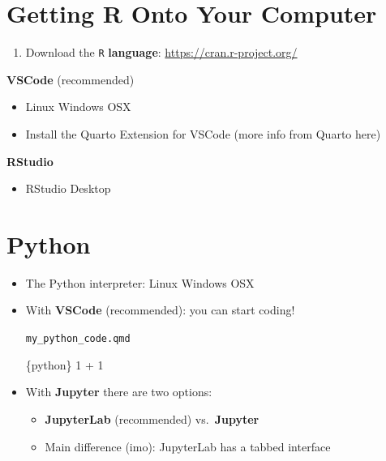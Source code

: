 \documentclass[
  letterpaper,
  DIV=11,
  numbers=noendperiod,
  oneside]{scrreprt}
\newenvironment{Shaded}{\begin{snugshade}}{\end{snugshade}}
\newcommand{\DecValTok}[1]{\textcolor[rgb]{0.68,0.00,0.00}{#1}}
\newcommand{\InformationTok}[1]{\textcolor[rgb]{0.37,0.37,0.37}{#1}}
\newcommand{\OperatorTok}[1]{\textcolor[rgb]{0.37,0.37,0.37}{#1}}
\providecommand{\tightlist}{%
  \setlength{\itemsep}{0pt}\setlength{\parskip}{0pt}}\usepackage{longtable,booktabs,array}
\begin{document}
\hypertarget{getting-r-onto-your-computer-1}{%
\section{Getting R Onto Your
Computer}\label{getting-r-onto-your-computer-1}}

\begin{enumerate}
\def\labelenumi{\arabic{enumi}.}
\tightlist
\item
  Download the \texttt{R} \textbf{language}:
  \url{https://cran.r-project.org/}
\end{enumerate}

\textbf{VSCode} (recommended)

\begin{itemize}
\item
  Linux \textbar{} Windows \textbar{} OSX
\item
  Install the Quarto Extension for VSCode (more info from Quarto here)
\end{itemize}

\textbf{RStudio}

\begin{itemize}
\tightlist
\item
  RStudio Desktop
\end{itemize}

\hypertarget{python-1}{%
\section{Python}\label{python-1}}

\begin{itemize}
\item
  The Python interpreter: Linux \textbar{} Windows \textbar{} OSX
\item
  With \textbf{VSCode} (recommended): you can start coding!

  \begin{codelisting}

  \caption{\texttt{my_python_code.qmd}}

\begin{Shaded}
\begin{Highlighting}[]
\InformationTok{\textasciigrave{}\textasciigrave{}\textasciigrave{}\{python\}}
\DecValTok{1} \OperatorTok{+} \DecValTok{1}
\InformationTok{\textasciigrave{}\textasciigrave{}\textasciigrave{}}
\end{Highlighting}
\end{Shaded}

  \end{codelisting}
\item
  With \textbf{Jupyter} there are two options:

  \begin{itemize}
  \tightlist
  \item
    \textbf{JupyterLab} (recommended) vs.~\textbf{Jupyter}
  \item
    Main difference (imo): JupyterLab has a tabbed interface
  \end{itemize}
\end{itemize}
\end{document}
